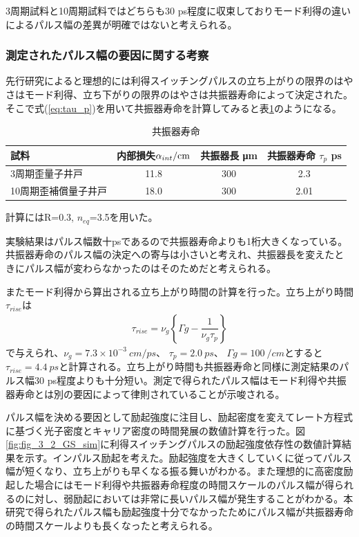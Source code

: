 {3周期試料と10周期試料ではどちらも30 ps程度に収束しておりモード利得の違いによるパルス幅の差異が明確ではないと考えられる。

\subsubsection{測定されたパルス幅の要因に関する考察}
先行研究によると理想的には利得スイッチングパルスの立ち上がりの限界のはやさはモード利得、立ち下がりの限界のはやさは共振器寿命によって決定された。
そこで式(\ref{eq:tau_p})を用いて共振器寿命を計算してみると表\ref{table:table_taup}のようになる。
\begin{table}[h]
  \caption{共振器寿命}
  \label{table:table_taup}
  \centering
  \begin{tabular}{lccc}
    \hline
    試料   &  内部損失$\alpha_{int} \rm{ /cm}$&共振器長  \si{\micro\metre} &共振器寿命 $\tau_{p}$  ps \\
    \hline \hline
     3周期歪量子井戸 &   11.8 &300 &2.3\\
    10周期歪補償量子井戸  & 18.0 &300&2.01\\
    \hline
  \end{tabular}
\end{table}

計算にはR=0.3, $n_{eq}$=3.5を用いた。

実験結果はパルス幅数十psであるので共振器寿命よりも1桁大きくなっている。共振器寿命のパルス幅の決定への寄与は小さいと考えれ、共振器長を変えたときにパルス幅が変わらなかったのはそのためだと考えられる。

またモード利得から算出される立ち上がり時間の計算を行った。立ち上がり時間$\tau_{rise}$は
\begin{eqnarray}
\tau _{rise}=\nu _{g}\left\lbrace  \Gamma g - \dfrac{1}{\nu_{g}\tau_{p}}\right\rbrace 
\end{eqnarray}
で与えられ、$\nu_{g}=7.3\times10^{-3} \ \si{cm/ps}$\cite{ref_takashi_ito}、 $\tau_{p}=2.0 \ \si{ps}$、 $\Gamma g=100\ \si{/cm}$とすると$\tau_{rise}=4.4\ \si{ps}$と計算される。立ち上がり時間も共振器寿命と同様に測定結果のパルス幅30 ps程度よりも十分短い。測定で得られたパルス幅はモード利得や共振器寿命とは別の要因によって律則されていることが示唆される。


パルス幅を決める要因として励起強度に注目し、励起密度を変えてレート方程式に基づく光子密度とキャリア密度の時間発展の数値計算を行った。図\ref{fig:fig_3_2_GS_sim}に利得スイッチングパルスの励起強度依存性の数値計算結果を示す。インパルス励起を考えた。励起強度を大きくしていくに従ってパルス幅が短くなり、立ち上がりも早くなる振る舞いがわかる。また理想的に高密度励起した場合にはモード利得や共振器寿命程度の時間スケールのパルス幅が得られるのに対し、弱励起においては非常に長いパルス幅が発生することがわかる。本研究で得られたパルス幅も励起強度十分でなかったためにパルス幅が共振器寿命の時間スケールよりも長くなったと考えられる。

}
